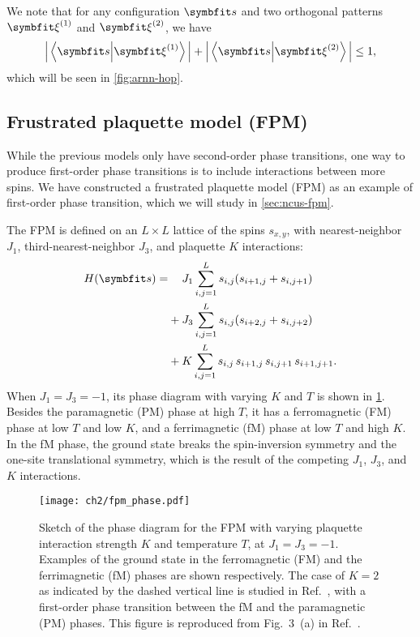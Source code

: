 We note that for any configuration $\vs$ and two orthogonal patterns $\vxi^{(1)}$ and $\vxi^{(2)}$, we have
\begin{equation}
\Big| \ip{\vs}{\vxi^{(1)}} \Big| + \Big| \ip{\vs}{\vxi^{(2)}} \Big| \le 1,
\end{equation}
which will be seen in \cref{fig:arnn-hop}.

\subsection{Frustrated plaquette model (FPM)}
\label{sec:fpm}

While the previous models only have second-order phase transitions, one way to produce first-order phase transitions is to include interactions between more spins. We have constructed a frustrated plaquette model (FPM) as an example of first-order phase transition, which we will study in \cref{sec:ncus-fpm}.

The FPM is defined on an $L \times L$ lattice of the spins $s_{x, y}$, with nearest-neighbor $J_1$, third-nearest-neighbor $J_3$, and plaquette $K$ interactions:
\begin{align}
H(\vs) = &\phantom{{}+{}} J_1 \sum_{i, j = 1}^L s_{i, j} (s_{i + 1, j} + s_{i, j + 1}) \nonumber \\
&+ J_3 \sum_{i, j = 1}^L s_{i, j} (s_{i + 2, j} + s_{i, j + 2}) \nonumber \\
&+ K \sum_{i, j = 1}^L s_{i, j} \, s_{i + 1, j} \, s_{i, j + 1} \, s_{i + 1, j + 1}.
\label{eq:fpm}
\end{align}
When $J_1 = J_3 = -1$, its phase diagram with varying $K$ and $T$ is shown in \cref{fig:fpm-phase}. Besides the paramagnetic (PM) phase at high $T$, it has a ferromagnetic (FM) phase at low $T$ and low $K$, and a ferrimagnetic (fM) phase at low $T$ and high $K$. In the fM phase, the ground state breaks the spin-inversion symmetry and the one-site translational symmetry, which is the result of the competing $J_1$, $J_3$, and $K$ interactions.

\begin{figure}[htb]
\centering
\texttt{[image: ch2/fpm\_phase.pdf]}
\caption[Phase diagram of frustrated plaquette model (FPM)]{
Sketch of the phase diagram for the FPM with varying plaquette interaction strength $K$ and temperature $T$, at $J_1 = J_3 = -1$.
Examples of the ground state in the ferromagnetic (FM) and the ferrimagnetic (fM) phases are shown respectively.
The case of $K = 2$ as indicated by the dashed vertical line is studied in Ref.~\cite{wu2021unbiased}, with a first-order phase transition between the fM and the paramagnetic (PM) phases.
This figure is reproduced from Fig.~3~(a) in Ref.~\cite{wu2021unbiased}.
}
\label{fig:fpm-phase}
\end{figure}

